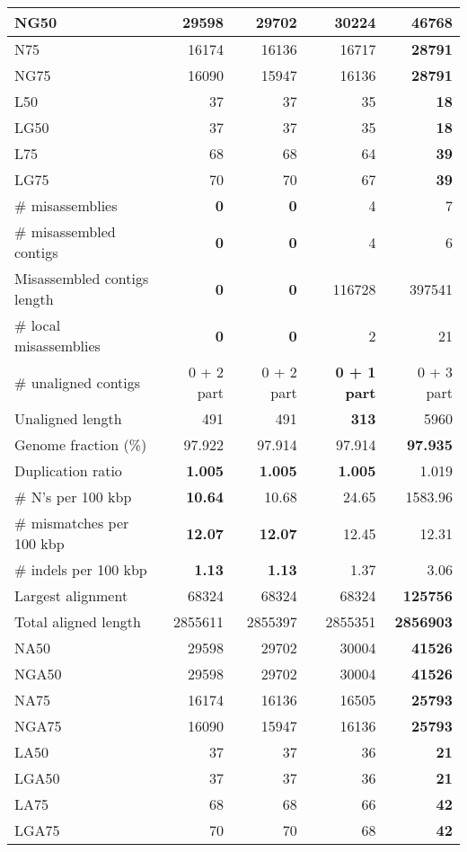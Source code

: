 \documentclass[12pt,a4paper]{article}
\begin{document}
\begin{table}[ht]
\begin{center}
\begin{tabular}{|l*{4}{|r}|}
NG50 & 29598 & 29702 & 30224 & {\bf 46768} \\ \hline
N75 & 16174 & 16136 & 16717 & {\bf 28791} \\ \hline
NG75 & 16090 & 15947 & 16136 & {\bf 28791} \\ \hline
L50 & 37 & 37 & 35 & {\bf 18} \\ \hline
LG50 & 37 & 37 & 35 & {\bf 18} \\ \hline
L75 & 68 & 68 & 64 & {\bf 39} \\ \hline
LG75 & 70 & 70 & 67 & {\bf 39} \\ \hline
\# misassemblies & {\bf 0} & {\bf 0} & 4 & 7 \\ \hline
\# misassembled contigs & {\bf 0} & {\bf 0} & 4 & 6 \\ \hline
Misassembled contigs length & {\bf 0} & {\bf 0} & 116728 & 397541 \\ \hline
\# local misassemblies & {\bf 0} & {\bf 0} & 2 & 21 \\ \hline
\# unaligned contigs & 0 + 2 part & 0 + 2 part & {\bf 0 + 1 part} & 0 + 3 part \\ \hline
Unaligned length & 491 & 491 & {\bf 313} & 5960 \\ \hline
Genome fraction (\%) & 97.922 & 97.914 & 97.914 & {\bf 97.935} \\ \hline
Duplication ratio & {\bf 1.005} & {\bf 1.005} & {\bf 1.005} & 1.019 \\ \hline
\# N's per 100 kbp & {\bf 10.64} & 10.68 & 24.65 & 1583.96 \\ \hline
\# mismatches per 100 kbp & {\bf 12.07} & {\bf 12.07} & 12.45 & 12.31 \\ \hline
\# indels per 100 kbp & {\bf 1.13} & {\bf 1.13} & 1.37 & 3.06 \\ \hline
Largest alignment & 68324 & 68324 & 68324 & {\bf 125756} \\ \hline
Total aligned length & 2855611 & 2855397 & 2855351 & {\bf 2856903} \\ \hline
NA50 & 29598 & 29702 & 30004 & {\bf 41526} \\ \hline
NGA50 & 29598 & 29702 & 30004 & {\bf 41526} \\ \hline
NA75 & 16174 & 16136 & 16505 & {\bf 25793} \\ \hline
NGA75 & 16090 & 15947 & 16136 & {\bf 25793} \\ \hline
LA50 & 37 & 37 & 36 & {\bf 21} \\ \hline
LGA50 & 37 & 37 & 36 & {\bf 21} \\ \hline
LA75 & 68 & 68 & 66 & {\bf 42} \\ \hline
LGA75 & 70 & 70 & 68 & {\bf 42} \\ \hline
\end{tabular}
\end{center}
\end{table}
\end{document}
